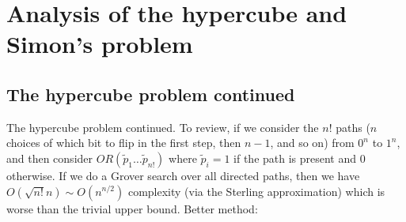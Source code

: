 \section{Analysis of the hypercube and Simon's problem}

\subsection*{The hypercube problem continued}
The hypercube problem continued.  To review, if  we consider the $n!$ paths ($n$ choices of which bit to flip in the first step, then $n-1$, and so on) from $0^n$ to $1^n$, and then consider $OR(\tilde{p}_1 \ldots \tilde{p}_{n!})$ where $\tilde{p}_i = 1$ if the path is present and 0 otherwise. If we do a Grover search over all directed paths, then we have $O(\sqrt{n!}n) \sim O(n^{n/2})$ complexity (via the Sterling approximation) which is worse than the trivial upper bound. Better method:

